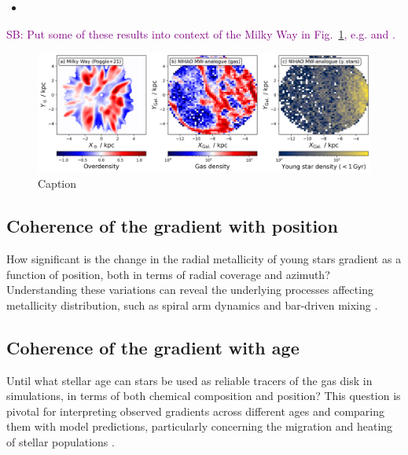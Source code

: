 \documentclass[fleqn,usenatbib]{mnras}
\newcommand{\SB}[1]{{\textcolor{purple}{SB: #1}}}
\begin{document}
\begin{itemize}
    \item 
\end{itemize}

\SB{Put some of these results into context of the Milky Way in Fig.~\ref{fig:overdensities_mw_vs_nihao}, e.g. \citet{Poggio2021} and \citet{Hackshaw2024}.}

\begin{figure}
    \centering
    \includegraphics[width=\textwidth]{figures/overdensities_mw_vs_nihao.png}
    \caption{Caption}
    \label{fig:overdensities_mw_vs_nihao}
\end{figure}

\subsection{Coherence of the gradient with position} \label{sec:discussion_coherence_position}

How significant is the change in the radial metallicity of young stars gradient as a function of position, both in terms of radial coverage and azimuth? Understanding these variations can reveal the underlying processes affecting metallicity distribution, such as spiral arm dynamics and bar-driven mixing \citep[see their Figs. 5-8][]{DiMatteo2013}.

\subsection{Coherence of the gradient with age} \label{sec:discussion_coherence_age}

Until what stellar age can stars be used as reliable tracers of the gas disk in simulations, in terms of both chemical composition and position? This question is pivotal for interpreting observed gradients across different ages \citep[e.g.][]{Willett2023} and comparing them with model predictions, particularly concerning the migration and heating of stellar populations \citep{Binney2008, Frankel2018}.
\end{document}
